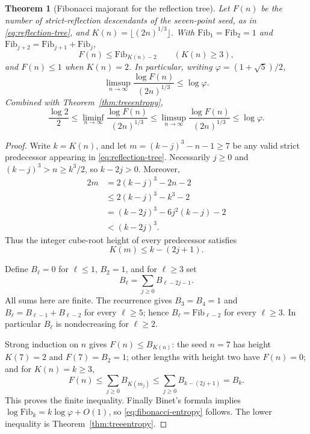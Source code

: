\documentclass[10pt]{article}
\newtheorem{theorem}{Theorem}
\begin{document}
\begin{theorem}[Fibonacci majorant for the reflection tree]
\label{thm:fibonacci-majorant}
Let $F(n)$ be the number of
strict-reflection descendants of the
seven-point seed, as in
\eqref{eq:reflection-tree}, and
$K(n)=\lfloor(2n)^{1/3}\rfloor$.
With $\mathrm{Fib}_1=\mathrm{Fib}_2=1$
and $\mathrm{Fib}_{j+2}=
\mathrm{Fib}_{j+1}+\mathrm{Fib}_{j}$,
\begin{equation}\label{eq:fibonacci-majorant}
\boxed{\displaystyle
F(n)\le\mathrm{Fib}_{K(n)-2}
\qquad(K(n)\ge3),}
\end{equation}
and $F(n)\le1$ when $K(n)=2$.
In particular, writing
$\varphi=(1+\sqrt5)/2$,
\begin{equation}\label{eq:fibonacci-entropy}
\boxed{\displaystyle
\limsup_{n\to\infty}
\frac{\log F(n)}{(2n)^{1/3}}
\le\log\varphi.}
\end{equation}
Combined with
Theorem~\ref{thm:treeentropy},
\[
\boxed{\displaystyle
\frac{\log2}{2}\le
\liminf_{n\to\infty}\frac{\log F(n)}{(2n)^{1/3}}
\le
\limsup_{n\to\infty}\frac{\log F(n)}{(2n)^{1/3}}
\le\log\varphi.}
\]
\end{theorem}
\begin{proof}
Write $k=K(n)$, and let
$m=(k-j)^3-n-1\ge7$
be any valid strict predecessor
appearing in \eqref{eq:reflection-tree}.
Necessarily $j\ge0$ and
$(k-j)^3>n\ge k^3/2$,
so $k-2j>0$. Moreover,
\[
\begin{aligned}
2m
&=2(k-j)^3-2n-2\\
&\le2(k-j)^3-k^3-2\\
&=(k-2j)^3-6j^2(k-j)-2\\
&<(k-2j)^3.
\end{aligned}
\]
Thus the integer cube-root height of
every predecessor satisfies
\[
\boxed{K(m)\le k-(2j+1).}
\]

Define $B_\ell=0$ for $\ell\le1$,
$B_2=1$, and for $\ell\ge3$ set
\[
B_\ell=\sum_{j\ge0} B_{\ell-2j-1}.
\]
All sums here are finite. The recurrence
gives $B_3=B_4=1$ and
$B_\ell=B_{\ell-1}+B_{\ell-2}$
for every $\ell\ge5$;
hence $B_\ell=\mathrm{Fib}_{\ell-2}$
for every $\ell\ge3$.
In particular $B_\ell$ is
nondecreasing for $\ell\ge2$.

Strong induction on $n$ gives
$F(n)\le B_{K(n)}$: the seed
$n=7$ has height $K(7)=2$ and
$F(7)=B_2=1$; other lengths
with height two have $F(n)=0$;
and for $K(n)=k\ge3$,
\[
F(n)\le
\sum_{j\ge0}B_{K(m_j)}
\le\sum_{j\ge0}B_{k-(2j+1)}
=B_k.
\]
This proves the finite inequality.
Finally Binet's formula implies
$\log\mathrm{Fib}_k=k\log\varphi+O(1)$,
so \eqref{eq:fibonacci-entropy}
follows. The lower inequality is
Theorem~\ref{thm:treeentropy}.
\end{proof}
\end{document}
